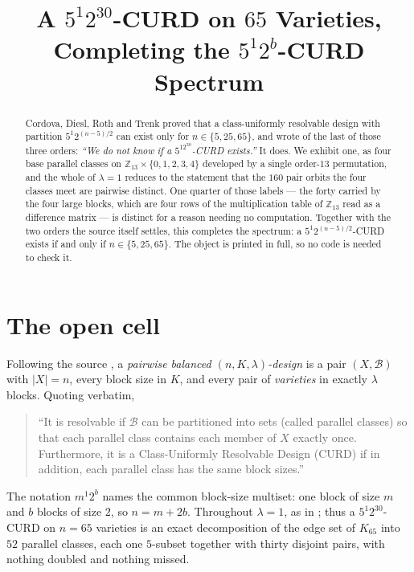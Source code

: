\documentclass[11pt]{amsart}
\title[A $5^12^{30}$-CURD on $65$ varieties]
{A $5^1 2^{30}$-CURD on $65$ Varieties, Completing the $5^1 2^{b}$-CURD
Spectrum}
\date{}
\theoremstyle{remark}
\begin{document}
\begin{abstract}
\sloppy
Cordova, Diesl, Roth and Trenk proved that a class-uniformly resolvable design
with partition $5^1 2^{(n-5)/2}$ can exist only for $n\in\{5,25,65\}$, and
wrote of the last of those three orders: \emph{``We do not know if a
$5^12^{30}$-CURD exists.''} It does. We exhibit one, as four base parallel
classes on $\mathbb Z_{13}\times\{0,1,2,3,4\}$ developed by a single
order-$13$ permutation, and the whole of $\lambda=1$ reduces to the statement
that the $160$ pair orbits the four classes meet are pairwise distinct. One
quarter of those labels --- the forty carried by the four large blocks, which
are four rows of the multiplication table of $\mathbb Z_{13}$ read as a
difference matrix --- is distinct for a reason needing no computation.
Together with the two orders the source itself settles, this completes the
spectrum: a $5^1 2^{(n-5)/2}$-CURD exists if and only if $n\in\{5,25,65\}$.
The object is printed in full, so no code is needed to check it.
\end{abstract}

\maketitle

\section{The open cell}

Following the source \cite{CDRT}, a \emph{pairwise balanced $(n,K,\lambda)$-design}
is a pair $(X,\mathcal B)$ with $|X|=n$, every block size in $K$, and every pair
of \emph{varieties} in exactly $\lambda$ blocks. Quoting \cite{CDRT} verbatim,
\begin{quote}
``It is resolvable if $\mathcal B$ can be partitioned into sets (called parallel
classes) so that each parallel class contains each member of $X$ exactly once.
Furthermore, it is a Class-Uniformly Resolvable Design (CURD) if in addition,
each parallel class has the same block sizes.''
\end{quote}
The notation $m^1 2^b$ names the common block-size multiset: one block of size
$m$ and $b$ blocks of size $2$, so $n=m+2b$. Throughout $\lambda=1$, as in
\cite{CDRT}; thus a $5^1 2^{30}$-CURD on $n=65$ varieties is an exact
decomposition of the edge set of $K_{65}$ into $52$ parallel classes, each one
$5$-subset together with thirty disjoint pairs, with nothing doubled and nothing
missed.
\end{document}
